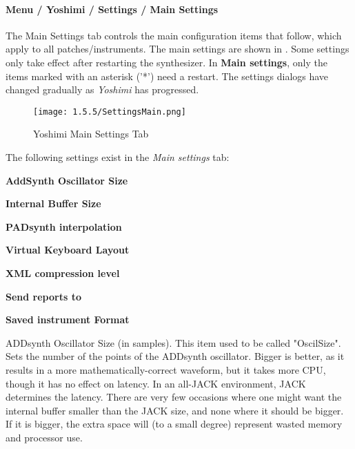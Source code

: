 \paragraph{Menu / Yoshimi / Settings / Main Settings}
\label{paragraph:menu_yoshimi_settings_main_settings}

   The Main Settings tab controls the main configuration items that
   follow, which apply to all patches/instruments.
   The main settings are shown in
   .
   Some settings only take effect after restarting the synthesizer.
   In \textbf{Main settings}, only the items marked with an asterisk ('*')
   need a restart.
   The settings dialogs have changed gradually as
   \textsl{Yoshimi} has progressed.

\begin{figure}[H]
   \centering
   \texttt{[image: 1.5.5/SettingsMain.png]}
   \caption{Yoshimi Main Settings Tab}
   \label{fig:yoshimi_main_settings_tab}
\end{figure}

   The following settings exist in the \textsl{Main settings} tab:

   \begin{enumber}
      \item \textbf{AddSynth Oscillator Size}
      \item \textbf{Internal Buffer Size}
      \item \textbf{PADsynth interpolation}
      \item \textbf{Virtual Keyboard Layout}
      \item \textbf{XML compression level}
      \item \textbf{Send reports to}
      \item \textbf{Saved instrument Format}
   \end{enumber}

   \setcounter{ItemCounter}{0}      %

   ADDsynth Oscillator Size (in samples).  This item used to be called
   "OscilSize".  Sets the number of the points of the ADDsynth oscillator.
   Bigger is better, as it results in a more mathematically-correct waveform,
   but it takes more CPU, though it has no effect on latency.
   In an all-JACK environment, JACK determines the latency.  There are very few
   occasions where one might want the internal buffer smaller than the JACK
   size, and none where it should be bigger. If it is bigger, the extra space
   will (to a small degree) represent wasted memory and processor use.

